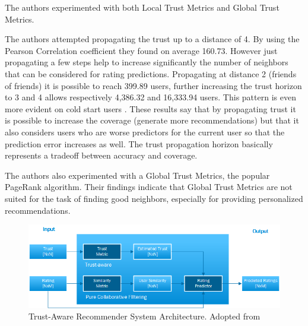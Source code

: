 The authors experimented with both Local Trust Metrics and Global Trust Metrics. 

The authors attempted propagating the trust up to a distance of 4. By using the Pearson Correlation coefficient they found on average 160.73. However just propagating a few steps help to increase significantly the number of neighbors that can be considered for rating predictions. Propagating at distance 2 (friends of friends) it is possible to reach 399.89 users, further increasing the trust horizon to 3 and 4 allows respectively 4,386.32 and 16,333.94 users. This pattern is even more evident on cold start users \cite{Massa2004}. These results say that by propagating trust it is possible to increase the coverage (generate more recommendations) but that it also considers users who are worse predictors for the current user so that the prediction error increases as well. The trust propagation horizon basically represents a tradeoff between accuracy and coverage.

The authors also experimented with a Global Trust Metrics, the popular PageRank algorithm. Their findings indicate that Global Trust Metrics are not suited for the task of finding good neighbors, especially for providing personalized recommendations.

\begin{figure}[H]
    \includegraphics[width=5in]{image/trustawarearchitecture.png}
    \centering
    \caption[Trust-Aware Recommender System Architecture]{Trust-Aware Recommender System Architecture. Adopted from \cite{Massa2004}}
    \label{figure:trustarchictecture}
\end{figure}


